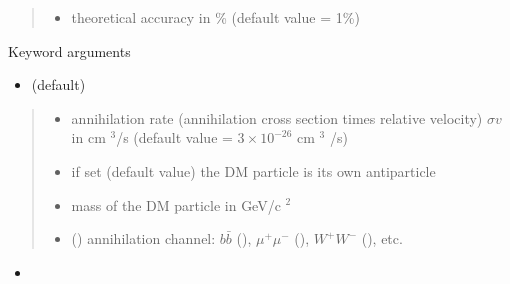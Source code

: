 \documentclass[letterpaper,10pt,english]{sphinxmanual}
\begin{document}
\begin{fulllineitems}
\begin{quote}
\begin{description}
\begin{itemize}
\item {} 
\sphinxAtStartPar
{} \textendash{} theoretical accuracy in \% (default value = 1\%)

\end{itemize}

\end{description}\end{quote}

\sphinxAtStartPar
Keyword arguments
\begin{itemize}
\item {} 
\sphinxAtStartPar
{}    (default)

\end{itemize}
\begin{quote}\begin{description}
\begin{itemize}
\item {} 
\sphinxAtStartPar
{} \textendash{} annihilation rate (annihilation cross section times relative velocity) \(\sigma v\) in cm \({}^3\)/s (default value = \(3 \times 10^{-26}\) cm \({}^3\) /s)

\item {} 
\sphinxAtStartPar
{} \textendash{} if set  (default value) the DM particle is its own antiparticle

\item {} 
\sphinxAtStartPar
{} \textendash{} mass of the DM particle in GeV/c \({}^2\)

\item {} 
\sphinxAtStartPar
{} () \textendash{} annihilation channel: \(b\bar b\) (), \(\mu^+ \mu^-\) (), \(W^+ W^-\) (), etc.

\end{itemize}

\end{description}\end{quote}
\begin{itemize}
\item {} 
\sphinxAtStartPar
{}


\end{itemize}
\end{fulllineitems}
\end{document}
